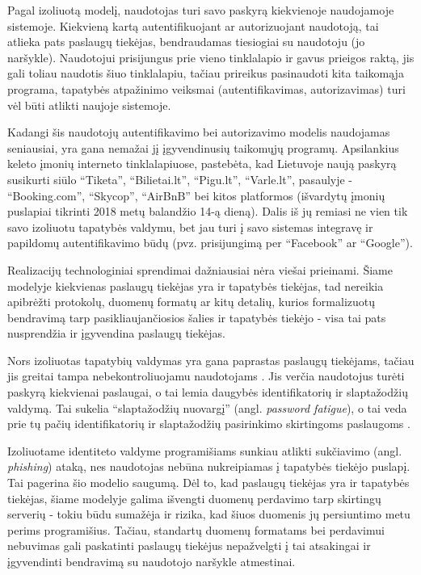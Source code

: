 Pagal izoliuotą modelį, naudotojas turi savo paskyrą kiekvienoje naudojamoje sistemoje. Kiekvieną kartą autentifikuojant ar autorizuojant
naudotoją, tai atlieka pats paslaugų tiekėjas, bendraudamas tiesiogiai su naudotoju (jo naršykle). Naudotojui prisijungus prie vieno tinklalapio ir gavus
prieigos raktą, jis gali toliau naudotis šiuo tinklalapiu, tačiau prireikus pasinaudoti kita taikomąja programa, tapatybės atpažinimo veiksmai (autentifikavimas, autorizavimas)
turi vėl būti atlikti naujoje sistemoje.


Kadangi šis naudotojų autentifikavimo bei autorizavimo modelis naudojamas seniausiai,
yra gana nemažai jį įgyvendinusių taikomųjų programų. Apsilankius keleto įmonių
interneto tinklalapiuose, pastebėta, kad Lietuvoje naują paskyrą susikurti siūlo
\enquote{Tiketa}, \enquote{Bilietai.lt}, \enquote{Pigu.lt},
\enquote{Varle.lt}, pasaulyje - \enquote{Booking.com}, \enquote{Skycop}, \enquote{AirBnB} bei kitos platformos (išvardytų
įmonių puslapiai tikrinti 2018 metų balandžio 14-ą dieną). Dalis iš jų remiasi ne vien tik savo izoliuotu tapatybės valdymu,
bet jau turi į savo sistemas integravę ir papildomų autentifikavimo būdų
(pvz. prisijungimą per \enquote{Facebook} ar \enquote{Google}).

Realizacijų technologiniai sprendimai dažniausiai nėra viešai prieinami.
Šiame modelyje kiekvienas paslaugų tiekėjas yra ir tapatybės tiekėjas, tad nereikia
apibrėžti protokolų, duomenų formatų ar kitų detalių, kurios formalizuotų bendravimą tarp pasikliaujančiosios šalies ir
tapatybės tiekėjo - visa tai pats nusprendžia ir įgyvendina paslaugų tiekėjas.


Nors izoliuotas tapatybių valdymas yra gana paprastas paslaugų tiekėjams, tačiau jis greitai tampa
nebekontroliuojamu naudotojams \cite{Josang2005}. Jis verčia naudotojus turėti paskyrą kiekvienai paslaugai, o tai lemia
daugybės identifikatorių ir slaptažodžių valdymą. Tai sukelia \enquote{slaptažodžių nuovargį} (angl. 
\textit{password fatigue}), o tai veda prie tų pačių identifikatorių ir slaptažodžių pasirinkimo skirtingoms paslaugoms \cite{Dhamija2008}.

Izoliuotame identiteto valdyme programišiams sunkiau atlikti sukčiavimo (angl. \textit{phishing}) ataką, nes naudotojas
nebūna nukreipiamas į tapatybės tiekėjo puslapį. Tai pagerina šio modelio saugumą. Dėl to, kad paslaugų tiekėjas yra ir tapatybės tiekėjas,
šiame modelyje galima išvengti duomenų perdavimo tarp skirtingų serverių - tokiu būdu sumažėja ir rizika, kad šiuos duomenis
jų persiuntimo metu perims programišius. Tačiau, standartų duomenų formatams bei perdavimui nebuvimas gali paskatinti paslaugų
tiekėjus nepažvelgti į tai atsakingai ir įgyvendinti bendravimą su naudotojo naršykle atmestinai.

